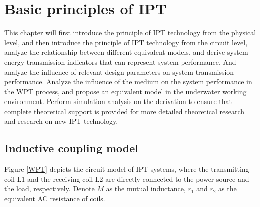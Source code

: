 \chapter{Basic principles of IPT}

This chapter will first introduce the principle of IPT technology from the physical level, and then introduce the principle of IPT technology from the circuit level, analyze the relationship between different equivalent models, and derive system energy transmission indicators that can represent system performance. And analyze the influence of relevant design parameters on system transmission performance. Analyze the influence of the medium on the system performance in the WPT process, and propose an equivalent model in the underwater working environment. Perform simulation analysis on the derivation to ensure that complete theoretical support is provided for more detailed theoretical research and research on new IPT technology.


\section{Inductive coupling model}
Figure \ref{WPT} depicts the circuit model of IPT systems, where the transmitting coil L1 and the receiving coil L2 are directly connected to the power source and the load, respectively. Denote $M$ as the mutual inductance, $r_1$ and $r_2$ as the equivalent AC resistance of coils.

